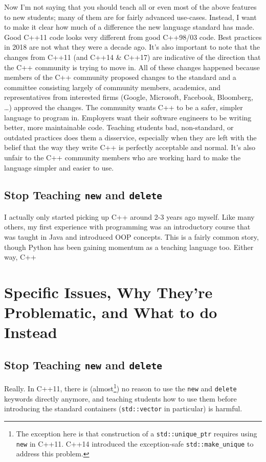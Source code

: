 \documentclass{article}
\newcommand{\uniqueptr}{\texttt{std::unique\_ptr}}
\newcommand{\CppNew}{\texttt{new}}
\newcommand{\CppDelete}{\texttt{delete}}
\begin{document}
Now I'm not saying that you should teach all or even most of the above features to new students; many of them are for fairly advanced use-cases.  Instead, I want to make it clear how much of a difference the new language standard has made.  Good C++11 code looks very different from good C++98/03 code.  Best practices in 2018 are not what they were a decade ago.  It's also important to note that the changes from C++11 (and C++14 \& C++17) are indicative of the direction that the C++ community is trying to move in.  All of these changes happened because members of the C++ community proposed changes to the standard and a committee consisting largely of community members, academics, and representatives from interested firms (Google, Microsoft, Facebook, Bloomberg, \ldots) approved the changes.  The community wants C++ to be a safer, simpler language to program in.  Employers want their software engineers to be writing better, more maintainable code.  Teaching students bad, non-standard, or outdated practices does them a disservice, especially when they are left with the belief that the way they write C++ is perfectly acceptable and normal.  It's also unfair to the C++ community members who are working hard to make the language simpler and easier to use.

\subsection*{Stop Teaching \CppNew{} and \CppDelete{}}
I actually only started picking up C++ around 2-3 years ago myself.  Like many others, my first experience with programming was an introductory course that was taught in Java and introduced OOP concepts.  This is a fairly common story, though Python has been gaining momentum as a teaching language too.  Either way, C++ 

\section*{Specific Issues, Why They're Problematic, and What to do Instead}


\subsection*{Stop Teaching \CppNew{} and \CppDelete{}}
Really.  In C++11, there is (almost\footnote{The exception here is that construction of a \uniqueptr{} requires using \CppNew{} in C++11. C++14 introduced the exception-safe \texttt{std::make\_unique} to address this problem.}) no reason to use the \CppNew{} and \CppDelete{} keywords directly anymore, and teaching students how to use them before introducing the standard containers (\texttt{std::vector} in particular) is harmful.  
\end{document}
